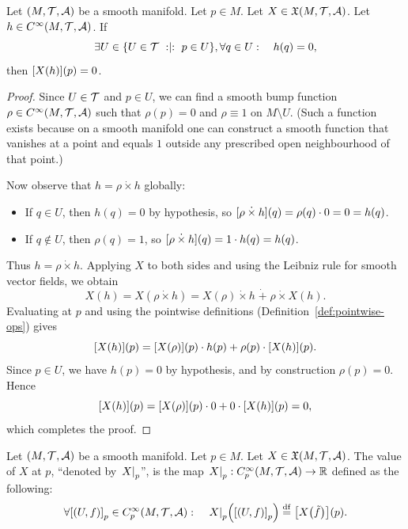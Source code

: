 \documentclass[11pt,reqno]{amsart}
\newcommand{\pwplus}{\mathbin{\dot{+}}}
\newcommand{\pwtimes}{\mathbin{\dot{\times}}}
\begin{document}
\begin{lemma}
\label{lem:locality-vector-field}
Let $(M,\mathcal{T},\mathcal{A})$ be a smooth manifold.
Let $p\in M$.
Let $X\in\mathfrak{X}(M,\mathcal{T},\mathcal{A})$.
Let $h\in C^\infty(M,\mathcal{T},\mathcal{A})$.
If
\[\exists U\in\set{U\in\T\st p\in U},\forall q\in U:\quad h(q)=0,\]
then $\FUNC{X(h)}{p}=0$.
\end{lemma}
\begin{proof}
Since $U\in\mathcal{T}$ and $p\in U$, we can find a smooth bump function
$\rho\in C^\infty(M,\mathcal{T},\mathcal{A})$ such that
$\rho(p)=0$ and $\rho\equiv 1$ on $M\setminus U$.
(Such a function exists because on a smooth manifold one can construct
a smooth function that vanishes at a point and equals $1$ outside any
prescribed open neighbourhood of that point.)

Now observe that $h=\rho\pwtimes h$ globally:
\begin{itemize}
\item If $q\in U$, then $h(q)=0$ by hypothesis,
  so $\FUNC{\rho\pwtimes h}{q}=\rho(q)\cdot 0=0=h(q)$.
\item If $q\notin U$, then $\rho(q)=1$, so
  $\FUNC{\rho\pwtimes h}{q}=1\cdot h(q)=h(q)$.
\end{itemize}
Thus $h=\rho\pwtimes h$.  Applying $X$ to both sides and using the
Leibniz rule for smooth vector fields, we obtain
\[
X(h)=X(\rho\pwtimes h)=X(\rho)\pwtimes h\;\pwplus\;\rho\pwtimes X(h).
\]
Evaluating at $p$ and using the pointwise definitions (Definition~\ref{def:pointwise-ops}) gives
\[
\FUNC{X(h)}{p}
=\FUNC{X(\rho)}{p}\cdot h(p)+\rho(p)\cdot\FUNC{X(h)}{p}.
\]
Since $p\in U$, we have $h(p)=0$ by hypothesis, and by construction
$\rho(p)=0$.  Hence
\[
\FUNC{X(h)}{p}= \FUNC{X(\rho)}{p}\cdot 0 + 0\cdot\FUNC{X(h)}{p}=0,
\]
which completes the proof.
\end{proof}

\begin{Def}
Let $(M,\mathcal{T},\mathcal{A})$ be a smooth manifold. Let $p\in M$.
Let $X\in\mathfrak{X}(M,\mathcal{T},\mathcal{A})$.
The value of $X$ at $p$,
``denoted by $\eval{X}_p$'', is the map $\eval{X}_p:C_p^\infty(M,\T,\A)\to\R$
defined as the following:
\[\forall{\SqBr{(U,f)}}_p\in C^\infty_p(M,\T,\A):\quad
\eval{X}_p\Br{{\SqBr{(U,f)}}_p}\df\FUNC{X\Br{\tilde f}}{p}.
\]
\end{Def}
\end{document}
